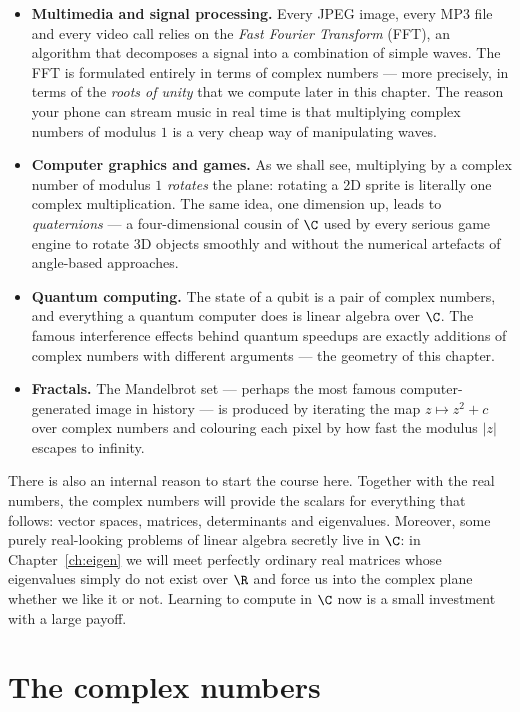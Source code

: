 \begin{itemize}
\item \textbf{Multimedia and signal processing.} Every JPEG image, every MP3 file and every video call
relies on the \emph{Fast Fourier Transform} (FFT), an algorithm that decomposes a signal into a
combination of simple waves. The FFT is formulated entirely in terms of complex numbers — more precisely,
in terms of the \emph{roots of unity} that we compute later in this chapter. The reason your phone
can stream music in real time is that multiplying complex numbers of modulus $1$ is a very cheap way of
manipulating waves.
\item \textbf{Computer graphics and games.} As we shall see, multiplying by a complex number of modulus
$1$ \emph{rotates} the plane: rotating a 2D sprite is literally one complex multiplication. The same idea,
one dimension up, leads to \emph{quaternions} — a four-dimensional cousin of $\C$ used by every serious
game engine to rotate 3D objects smoothly and without the numerical artefacts of angle-based approaches.
\item \textbf{Quantum computing.} The state of a qubit is a pair of complex numbers, and everything a
quantum computer does is linear algebra over $\C$. The famous interference effects behind quantum speedups
are exactly additions of complex numbers with different arguments — the geometry of this chapter.
\item \textbf{Fractals.} The Mandelbrot set — perhaps the most famous computer-generated image in history —
is produced by iterating the map $z\mapsto z^2+c$ over complex numbers and colouring each pixel by how fast
the modulus $|z|$ escapes to infinity.
\end{itemize}

There is also an internal reason to start the course here. Together with the real numbers, the complex
numbers will provide the scalars for everything that follows: vector spaces, matrices, determinants and
eigenvalues. Moreover, some purely
real-looking problems of linear algebra secretly live in $\C$: in Chapter~\ref{ch:eigen} we will meet
perfectly ordinary real matrices whose eigenvalues simply do not exist over $\R$ and force us into the
complex plane whether we like it or not. Learning to compute in $\C$ now is a small investment with a
large payoff.

\section{The complex numbers}

